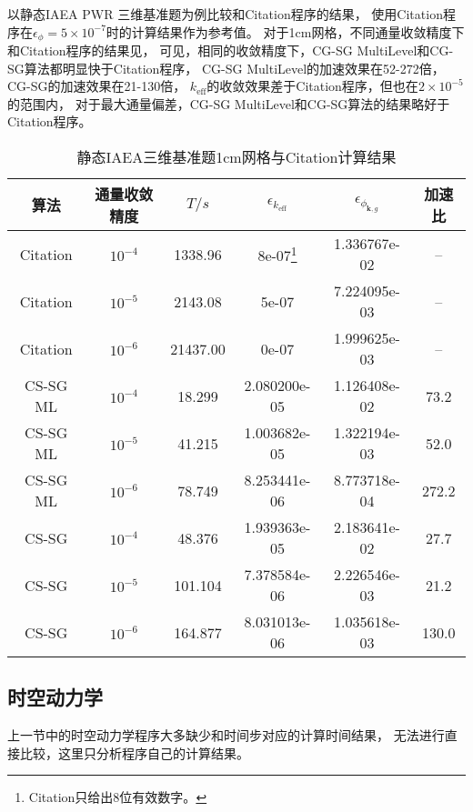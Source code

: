 以静态IAEA PWR 三维基准题为例比较\ProgramName 和Citation程序的结果，
使用Citation程序在$\epsilon_\phi=5\times10^{-7}$时的计算结果作为参考值。
对于1cm网格，不同通量收敛精度下\ProgramName 和Citation程序的结果见，
可见，相同的收敛精度下，CG-SG MultiLevel和CG-SG算法都明显快于Citation程序，
CG-SG MultiLevel的加速效果在52-272倍，CG-SG的加速效果在21-130倍，
$k_\mathrm{eff}$的收敛效果差于Citation程序，但也在$2\times10^{-5}$的范围内，
对于最大通量偏差，CG-SG MultiLevel和CG-SG算法的结果略好于Citation程序。

\begin{table}
\centering
\caption{\label{tab:testresult.iaea}静态IAEA三维基准题1cm网格\ProgramName 与Citation计算结果}
\begin{minipage}{\textwidth}
\centering
\begin{tabular}{cccccc}
\toprule
算法 & 通量收敛精度 & $T/s$ & $\epsilon_{k_\mathrm{eff}}$ & $\epsilon_{\phi_{\bm{k},g}}$ & 加速比\\
\midrule
Citation & $10^{-4}$ & 1338.96 & 8e-07\footnote{Citation只给出8位有效数字。} & 1.336767e-02 & --\\
Citation & $10^{-5}$ & 2143.08 & 5e-07 & 7.224095e-03 & --\\
Citation & $10^{-6}$ & 21437.00 & 0e-07 & 1.999625e-03 & --\\
CS-SG ML & $10^{-4}$ & 18.299 & 2.080200e-05 & 1.126408e-02 & 73.2\\
CS-SG ML & $10^{-5}$ & 41.215 & 1.003682e-05 & 1.322194e-03 & 52.0\\
CS-SG ML & $10^{-6}$ & 78.749 & 8.253441e-06 & 8.773718e-04 & 272.2\\
CS-SG & $10^{-4}$ &  48.376 & 1.939363e-05 & 2.183641e-02 & 27.7\\
CS-SG & $10^{-5}$ & 101.104 & 7.378584e-06 & 2.226546e-03 & 21.2\\
CS-SG & $10^{-6}$ & 164.877 & 8.031013e-06 & 1.035618e-03 & 130.0\\
\bottomrule
\end{tabular}
\end{minipage}
\end{table}


\subsection{时空动力学}

上一节中的时空动力学程序大多缺少和时间步对应的计算时间结果，
无法进行直接比较，这里只分析\ProgramName 程序自己的计算结果。

